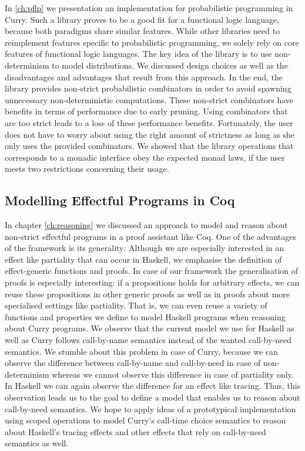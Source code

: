 In \autoref{ch:pflp} we presentation an implementation for probabilistic programming in Curry.
Such a library proves to be a good fit for a functional logic language, because both paradigms share similar features.
While other libraries need to reimplement features specific to probabilistic programming, we solely rely on core features of functional logic languages.
The key idea of the library is to use non-determinism to model distributions.
We discussed design choices as well as the disadvantages and advantages that result from this approach.
In the end, the library provides non-strict probabilistic combinators in order to avoid spawning unnecessary non-deterministic computations.
These non-strict combinators have benefits in terms of performance due to early pruning.
Using combinators that are too strict leads to a loss of these performance benefits.
Fortunately, the user does not have to worry about using the right amount of strictness as long as she only uses the provided combinators.
We showed that the library operations that corresponds to a monadic interface obey the expected monad laws, if the user meets two restrictions concerning their usage.

\subsection*{Modelling Effectful Programs in Coq}

In chapter \autoref{ch:reasoning} we discussed an approach to model and reason about non-strict effectful programs in a proof assistant like Coq.
One of the advantages of the framework is its generality: Although we are especially interested in an effect like partiality that can occur in Haskell, we emphasise the definition of effect-generic functions and proofs.
In case of our framework the generalisation of proofs is especially interesting: if a propositions holds for arbitrary effects, we can reuse these propositions in other generic proofs as well as in proofs about more specialised settings like partiality.
That is, we can even reuse a variety of functions and properties we define to model Haskell programs when reasoning about Curry programs.
We observe that the current model we use for Haskell as well as Curry follows call-by-name semantics instead of the wanted call-by-need semantics.
We stumble about this problem in case of Curry, because we can observe the difference between call-by-name and call-by-need in case of non-determinism whereas we cannot observe this difference in case of partiality only.
In Haskell we can again observe the difference for an effect like tracing.
Thus, this observation leads us to the goal to define a model that enables us to reason about call-by-need semantics.
We hope to apply ideas of a prototypical implementation using scoped operations to model Curry's call-time choice semantics to reason about Haskell's tracing effects and other effects that rely on call-by-need semantics as well.
